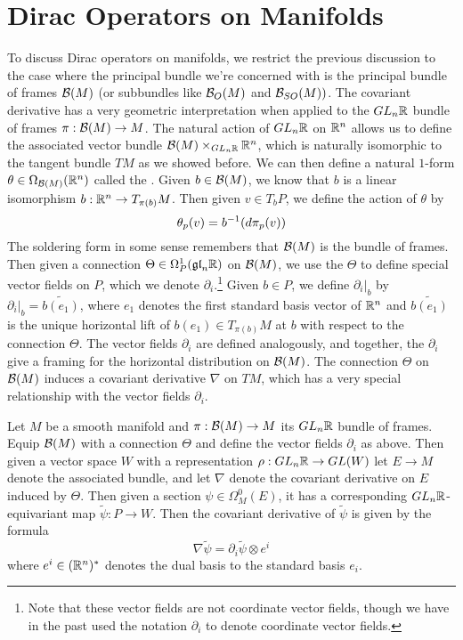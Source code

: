 %
\section{Dirac Operators on Manifolds}
%
To discuss Dirac operators on manifolds, we restrict the previous discussion
to the case where the principal bundle we're concerned with is the principal
bundle of frames $\mathcal{B}(M)$ (or subbundles like $\mathcal{B}_O(M)$ and $\mathcal{B}_{SO}(M))$.
The covariant derivative has a very geometric interpretation
when applied to the $GL_n\mathbb{R}$ bundle of frames $\pi : \mathcal{B}(M) \to M$.
The natural action of $GL_n\mathbb{R}$ on $\mathbb{R}^n$ allows us to
define the associated vector bundle $\mathcal{B}(M) \times_{GL_n\mathbb{R}} \mathbb{R}^n$, which is
naturally isomorphic to the tangent bundle $TM$ as we showed before. We can then
define a natural $1$-form $\theta \in \Omega_{\mathcal{B}(M)}(\mathbb{R}^n)$ called the
. Given $b \in \mathcal{B}(M)$, we know that $b$ is a linear
isomorphism $b : \mathbb{R}^n \to T_{\pi(b)}M$. Then given $v \in T_bP$, we
define the action of $\theta$ by
\[
\theta_p(v) = b^{-1}(d\pi_p(v))
\]
The soldering form in some sense remembers that $\mathcal{B}(M)$ is the bundle of
frames. Then given a connection $\Theta \in \Omega_P^1(\mathfrak{gl}_n\mathbb{R})$ on $\mathcal{B}(M)$,
we use the $\Theta$ to define special vector fields on $P$, which we
denote $\partial_i$.\footnote{Note that these vector fields are not coordinate
vector fields, though we have in the past used the notation $\partial_i$ to
denote coordinate vector fields.} Given $b \in P$, we define $\partial_i\vert_b$
by $\partial_i\vert_b = \widetilde{b(e_1)}$, where $e_1$ denotes the first
standard basis vector of $\mathbb{R}^n$ and $\widetilde{b(e_1)}$ is the unique horizontal
lift of $b(e_1) \in T_{\pi(b)}M$ at $b$ with respect to the connection $\Theta$.
The vector fields $\partial_i$ are defined analogously, and together, the
$\partial_i$ give a framing for the horizontal distribution on $\mathcal{B}(M)$.
The connection $\Theta$ on $\mathcal{B}(M)$ induces a covariant derivative $\nabla$ on
$TM$, which has a very special relationship with the vector fields $\partial_i$.
%
\begin{prop}
Let $M$ be a smooth manifold and $\pi : \mathcal{B}(M) \to M$ its $GL_n\mathbb{R}$ bundle
of frames. Equip $\mathcal{B}(M)$ with a connection $\Theta$ and define the vector fields
$\partial_i$ as above. Then given a vector space $W$ with a representation
$\rho : GL_n\mathbb{R} \to GL(W)$ let $E \to M$ denote the associated bundle, and
let $\nabla$ denote the covariant derivative on $E$ induced by $\Theta$. Then
given a section $\psi \in \Omega_M^0(E)$, it has a corresponding
$GL_n\mathbb{R}$-equivariant map $\tilde{\psi} : P \to W$. Then the covariant derivative
of $\tilde{\psi}$ is given by the formula
\[
\nabla\tilde{\psi} = \partial_i\tilde{\psi} \otimes e^i
\]
where $e^i \in (\mathbb{R}^n)^*$ denotes the dual basis to the standard basis $e_i$.
\end{prop}
